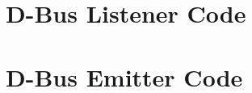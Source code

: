 \documentclass{ifacconf}
\begin{document}







\appendix
\section{D-Bus Listener Code}    %

\section{D-Bus Emitter Code}              %
\end{document}

